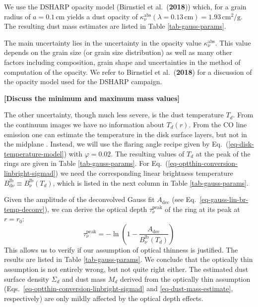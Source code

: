 \documentclass{aa}
\def\paperdsharpbirnstiel{Birnstiel et al.\ ({\bf 2018})}
\begin{document}
We use the DSHARP opacity model (\paperdsharpbirnstiel{}) which, for a grain
radius of $a=0.1\,\mathrm{cm}$ yields a dust opacity of
$\kappa_\nu^{\mathrm{abs}}(\lambda=0.13\,\mathrm{cm})=1.93\,\mathrm{cm}^2/\mathrm{g}$.
The resulting dust mass estimates are listed in Table \ref{tab-gauss-params}.

The main uncertainty lies in the uncertainty in the opacity value
$\kappa_\nu^{\mathrm{abs}}$. This value depends on the grain size (or grain size
distribution) as well as many other factors including composition, grain shape
and uncertainties in the method of computation of the opacity. We refer to
\paperdsharpbirnstiel{} for a discussion of the opacity model used for the
DSHARP campaign.

{\bf [Discuss the minimum and maximum mass values]}

The other uncertainty, though much less severe, is the dust temperature
$T_d$. From the continuum images we have no information about $T_d(r)$. From the
CO line emission one can estimate the temperature in the disk surface layers,
but not in the midplane \citep[see e.g.][]{2018ApJ...853..113W}. Instead, we
will use the flaring angle recipe given by Eq.~(\ref{eq-disk-temperature-model})
with $\varphi=0.02$. The resulting values of $T_d$ at the peak of the rings are
given in Table \ref{tab-gauss-params}. For
Eq.~(\ref{eq-optthin-conversion-linbright-sigmad}) we need the corresponding
linear brightness temperature $B_{\mathrm{d}\nu}^{\mathrm{lb}}\equiv B_\nu^{\mathrm{lb}}(T_d)$, which is listed in the
next column in Table \ref{tab-gauss-params}.

Given the amplitude of the deconvolved Gauss fit $A_{\mathrm{dec}}$ (see
Eq.~\ref{eq-gauss-lin-br-temp-deconv}), we can derive the optical depth
$\tau_\nu^{\mathrm{peak}}$ of the ring at its peak at $r=r_0$:
\begin{equation}\label{eq-tau-estimate}
\tau_\nu^{\mathrm{peak}} = -\ln\left(1-\frac{A_{\mathrm{dec}}}{B_{\nu}^{\mathrm{lb}}(T_d)}\right)
\end{equation}
This allows us to verify if our assumption of optical thinness is justified. The
results are listed in Table \ref{tab-gauss-params}.  We conclude that the
optically thin assumption is not entirely wrong, but not quite right either. The
estimated dust surface density $\Sigma_d$ and dust mass $M_d$ derived from the
optically thin assumption (Eqs.~\ref{eq-optthin-conversion-linbright-sigmad} and
\ref{eq-dust-mass-estimate}, respectively) are only mildly affected by the
optical depth effects.
\end{document}
